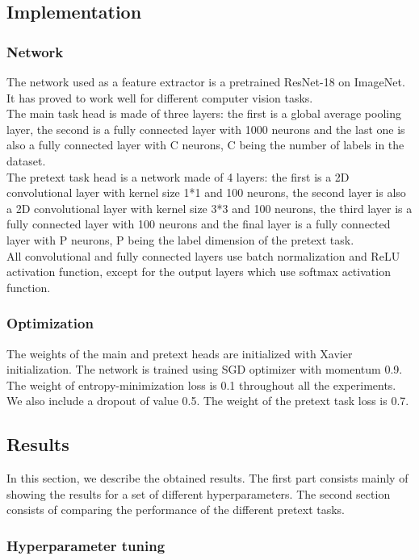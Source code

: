 \documentclass[conference]{IEEEtran}
\begin{document}
\subsection{Implementation}
\subsubsection{Network}
The network used as a feature extractor is a pretrained ResNet-18 on ImageNet. It has proved to work well for different computer vision tasks. \\
The main task head is made of three layers: the first is a global average pooling layer, the second is a fully connected layer with 1000 neurons and the last one is also a fully connected layer with C neurons, C being the number of labels in the dataset. \\
The pretext task head is a network made of 4 layers: the first is a 2D convolutional layer with kernel size 1*1 and 100 neurons, the second layer is also a 2D convolutional layer with kernel size 3*3 and 100 neurons, the third layer is a fully connected layer with 100 neurons and the final layer is a fully connected layer with P neurons, P being the label dimension of the pretext task.\\
All convolutional and fully connected layers use batch normalization and ReLU activation function, except for the output layers which use softmax activation function.

\subsubsection{Optimization}
The weights of the main and pretext heads are initialized with Xavier initialization. The network is trained using SGD optimizer with momentum 0.9. The weight of entropy-minimization loss is 0.1 throughout all the experiments. We also include a dropout of value 0.5. The weight of the pretext task loss is 0.7. 
\subsection{Results}
In this section, we describe the obtained results. The first part consists mainly of showing the results for a set of different hyperparameters. The second section consists of comparing the performance of the different pretext tasks.
\subsubsection{Hyperparameter tuning}
\end{document}
